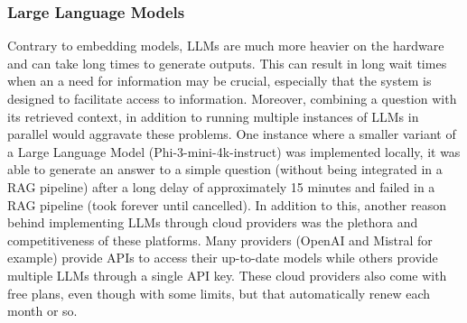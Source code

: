 \subsubsection{Large Language Models}
Contrary to embedding models, LLMs are much more heavier on the hardware and can take long times to generate outputs. This can result in long wait times when an a need for information may be crucial, especially that the system is designed to facilitate access to information. Moreover, combining a question with its retrieved context, in addition to running multiple instances of LLMs in parallel would aggravate these problems.\newline
One instance where a smaller variant of a Large Language Model (Phi-3-mini-4k-instruct) was implemented locally, it was able to generate an answer to a simple question (without being integrated in a RAG pipeline) after a long delay of approximately 15 minutes and failed in a RAG pipeline (took forever until cancelled). In addition to this, another reason behind implementing LLMs through cloud providers was the plethora and competitiveness of these platforms. Many providers (OpenAI and Mistral for example) provide APIs to access their up-to-date models while others provide multiple LLMs through a single API key. These cloud providers also come with free plans, even though with some limits, but that automatically renew each month or so.
